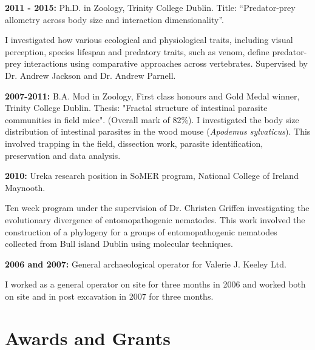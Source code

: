 \documentclass[10pt,a4paper]{article}
\begin{document}
\raggedright	
\textbf{2011 - 2015:} Ph.D. in Zoology, Trinity College Dublin. Title: “Predator-prey allometry across body size and interaction dimensionality”.\\ \par{\fontsize{10.5}{10} I investigated how various ecological and physiological traits, including visual perception, species lifespan and predatory traits, such as venom, define predator-prey interactions using comparative approaches across vertebrates. Supervised by Dr. Andrew Jackson and Dr. Andrew Parnell.
\bigskip}


\textbf{2007-2011:} B.A. Mod in Zoology, First class honours and Gold Medal winner, Trinity College Dublin.
Thesis: "Fractal structure of intestinal parasite communities in field mice". (Overall mark of 82\%).
I investigated the body size distribution of intestinal parasites in the wood mouse (\textit{Apodemus sylvaticus}). This involved trapping in the field, dissection work, parasite identification, preservation and data analysis.
\bigskip

\textbf{2010:} Ureka research position in SoMER program, National College of Ireland Maynooth.\\
\par{\fontsize{10.5}{10} Ten week program under the supervision of Dr. Christen Griffen investigating the evolutionary divergence of entomopathogenic nematodes. This work involved the construction of a phylogeny for a groups of entomopathogenic nematodes collected from Bull island Dublin using molecular techniques.}
\bigskip

\textbf{2006 and 2007:} General archaeological operator for Valerie J. Keeley Ltd.\\
\par{\fontsize{10.5}{10} I worked as a general operator on site for three months in 2006 and worked both on site
and in post excavation in 2007 for three months.
}
\bigskip



\section{Awards and Grants}
\end{document}
